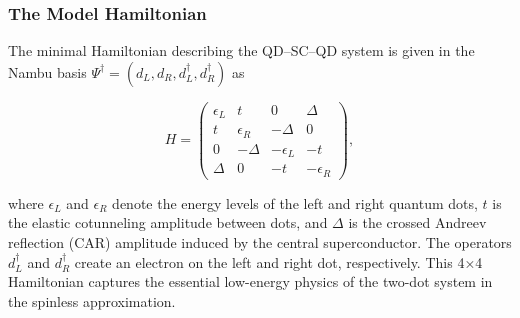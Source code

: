 \documentclass[11pt, letterpaper, titlepage]{article}
\begin{document}
\subsubsection{The Model Hamiltonian}

The minimal Hamiltonian describing the QD–SC–QD system is given in the Nambu basis $\Psi^\dagger = (d_L, d_R, d_L^\dagger, d_R^\dagger)$ as

\begin{equation}
  H = \begin{pmatrix}
    \epsilon_L & t & 0 & \Delta \\
    t & \epsilon_R & -\Delta & 0 \\
    0 & -\Delta & -\epsilon_L & -t \\
    \Delta & 0 & -t & -\epsilon_R
  \end{pmatrix},
\end{equation}

where $\epsilon_L$ and $\epsilon_R$ denote the energy levels of the left and right quantum dots, $t$ is the elastic cotunneling amplitude between dots, and $\Delta$ is the crossed Andreev reflection (CAR) amplitude induced by the central superconductor. The operators $d_L^\dagger$ and $d_R^\dagger$ create an electron on the left and right dot, respectively. This 4×4 Hamiltonian captures the essential low-energy physics of the two-dot system in the spinless approximation.

\end{document}
